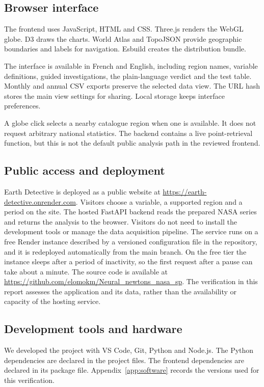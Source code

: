 \documentclass[10pt,a4paper,twocolumn]{article}
\begin{document}
\subsection{Browser interface}
The frontend uses JavaScript, HTML and CSS. Three.js renders the WebGL globe. D3 draws the charts. World Atlas and TopoJSON provide geographic boundaries and labels for navigation. Esbuild creates the distribution bundle.

The interface is available in French and English, including region names, variable definitions, guided investigations, the plain-language verdict and the test table. Monthly and annual CSV exports preserve the selected data view. The URL hash stores the main view settings for sharing. Local storage keeps interface preferences.

A globe click selects a nearby catalogue region when one is available. It does not request arbitrary national statistics. The backend contains a live point-retrieval function, but this is not the default public analysis path in the reviewed frontend.

\subsection{Public access and deployment}
Earth Detective is deployed as a public website at \url{https://earth-detective.onrender.com}. Visitors choose a variable, a supported region and a period on the site. The hosted FastAPI backend reads the prepared NASA series and returns the analysis to the browser. Visitors do not need to install the development tools or manage the data acquisition pipeline. The service runs on a free Render instance described by a versioned configuration file in the repository, and it is redeployed automatically from the main branch. On the free tier the instance sleeps after a period of inactivity, so the first request after a pause can take about a minute. The source code is available at \url{https://github.com/elomokm/Neural_newtons_nasa_sp}. The verification in this report assesses the application and its data, rather than the availability or capacity of the hosting service.

\subsection{Development tools and hardware}
We developed the project with VS Code, Git, Python and Node.js. The Python dependencies are declared in the project files. The frontend dependencies are declared in its package file. Appendix~\ref{app:software} records the versions used for this verification.
\end{document}
